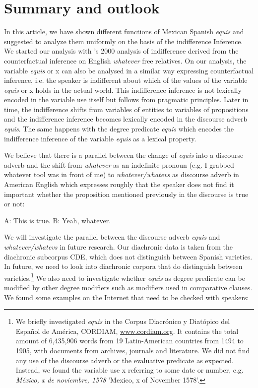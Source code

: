 \documentclass[output=paper
,modfonts
,nonflat]{langsci/langscibook}
\begin{document}
\section{Summary and outlook}\label{sec:kellert:6}
In this article, we have shown different functions of Mexican Spanish \textit{equis} and suggested to analyze them uniformly on the basis of the indifference Inference. We started our analysis with \citeauthor{Fintel2000}’s 2000 analysis of indifference derived from the counterfactual inference on English \textit{whatever} free relatives. On our analysis, the variable \textit{equis} or x can also be analysed in a similar way expressing counterfactual inference, i.e. the speaker is indifferent about which of the values of the variable \textit{equis} or x holds in the actual world. This indifference inference is not lexically encoded in the variable use itself but follows from pragmatic principles. Later in time, the indifference shifts from variables of entities to variables of propositions and the indifference inference becomes lexically encoded in the discourse adverb \textit{equis}. The same happens with the degree predicate \textit{equis} which encodes the indifference inference of the variable \textit{equis} as a lexical property.

We believe that there is a parallel between the change of \textit{equis} into a discourse adverb and the shift from \textit{whatever} as an indefinite pronoun (e.g. I grabbed whatever tool was in front of me) to \textit{whatever/whatevs} as discourse adverb in American English which expresses roughly that the speaker does not find it important whether the proposition mentioned previously in the discourse is true or not:

\ea
A: This is true. B: Yeah, whatever.
\z

We will investigate the parallel between the discourse adverb \textit{equis} and \textit{whatever/whatevs} in future research. Our diachronic data is taken from the diachronic subcorpus CDE, which does not distinguish between Spanish varieties. In future, we need to look into diachronic corpora that do distinguish between varieties.\footnote{We briefly investigated \textit{equis} in the Corpus Diacrónico y Diatópico del Español de América, CORDIAM, \href{http://www.cordiam.org}{www.cordiam.org}. It contains the total amount of 6,435,906 words from 19 Latin-American countries from 1494 to 1905, with documents from archives, journals and literature. We did not find any use of the discourse adverb or the evaluative predicate as expected. Instead, we found the variable use x referring to some date or number, e.g. \textit{México, x de noviembre, 1578} 'Mexico, x of November 1578'.}
We also need to investigate whether \textit{equis} as degree predicate can be modified by other degree modifiers such as modifiers used in comparative clauses. We found some examples on the Internet that need to be checked with speakers:
\end{document}
